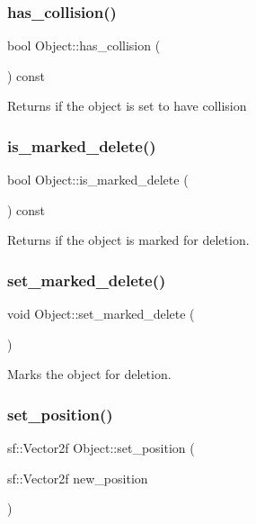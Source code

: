 \subsubsection{\texorpdfstring{has\+\_\+collision()}{has\_collision()}}
{\footnotesize\ttfamily bool Object\+::has\+\_\+collision (\begin{DoxyParamCaption}{ }\end{DoxyParamCaption}) const}

Returns if the object is set to have collision \mbox{\label{classObject_a31751928d2d716780fe65d02681e1f42}} 
\subsubsection{\texorpdfstring{is\+\_\+marked\+\_\+delete()}{is\_marked\_delete()}}
{\footnotesize\ttfamily bool Object\+::is\+\_\+marked\+\_\+delete (\begin{DoxyParamCaption}{ }\end{DoxyParamCaption}) const}

Returns if the object is marked for deletion. \mbox{\label{classObject_a81f2978454364d1891861b24473ef3a8}} 
\subsubsection{\texorpdfstring{set\+\_\+marked\+\_\+delete()}{set\_marked\_delete()}}
{\footnotesize\ttfamily void Object\+::set\+\_\+marked\+\_\+delete (\begin{DoxyParamCaption}{ }\end{DoxyParamCaption})}

Marks the object for deletion. \mbox{\label{classObject_a121d4f9b1f359924d6a2cf77a1d0db52}} 
\subsubsection{\texorpdfstring{set\+\_\+position()}{set\_position()}}
{\footnotesize\ttfamily sf\+::\+Vector2f Object\+::set\+\_\+position (\begin{DoxyParamCaption}\item[{sf\+::\+Vector2f}]{new\+\_\+position }\end{DoxyParamCaption})}

